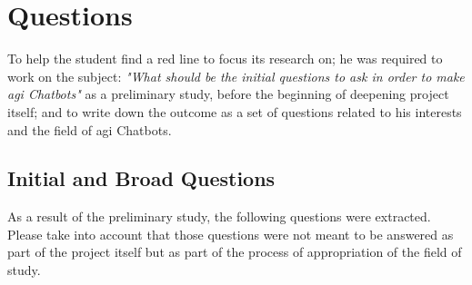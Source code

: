\chapter{Questions}
\label{chap:questions}

To help the student find a red line to focus its research on; he was required to work on the subject: \textit{"What should be the initial questions to ask in order to make \gls{agi} Chatbots"} as a preliminary study, before the beginning of deepening project itself; and to write down the outcome as a set of questions related to his interests and the field of \gls{agi} Chatbots.

\section{Initial and Broad Questions}
As a result of the preliminary study, the following questions were extracted. Please take into account that those questions were not meant to be answered as part of the project itself but as part of the process of appropriation of the field of study.

